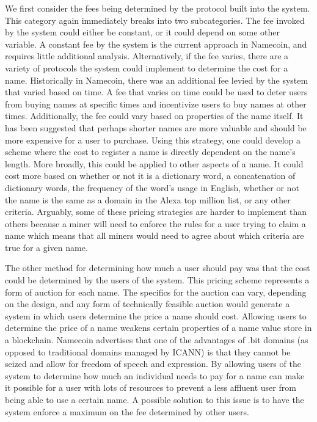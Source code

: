 We first consider the fees being determined by the protocol built into the system. This category again immediately breaks into two subcategories. The fee invoked by the system could either be constant, or it could depend on some other variable. A constant fee by the system is the current approach in Namecoin, and requires little additional analysis. Alternatively, if the fee varies, there are a variety of protocols the system could implement to determine the cost for a name. Historically in Namecoin, there was an additional fee levied by the system that varied based on time. A fee that varies on time could be used to deter users from buying names at specific times and incentivize users to buy names at other times. Additionally, the fee could vary based on properties of the name itself. It has been suggested that perhaps shorter names are more valuable and should be more expensive for a user to purchase. Using this strategy, one could develop a scheme where the cost to register a name is directly dependent on the name's length. More broadly, this could be applied to other aspects of a name. It could cost more based on whether or not it is a dictionary word, a concatenation of dictionary words, the frequency of the word's usage in English, whether or not the name is the same as a domain in the Alexa top million list, or any other criteria. Arguably, some of these pricing strategies are harder to implement than others because a miner will need to enforce the rules for a user trying to claim a name which means that all miners would need to agree about which criteria are true for a given name.

The other method for determining how much a user should pay was that the cost could be determined by the users of the system. This pricing scheme represents a form of auction for each name. The specifics for the auction can vary, depending on the design, and any form of technically feasible auction would generate a system in which users determine the price a name should cost.  Allowing users to determine the price of a name weakens certain properties of a name value store in a blockchain. Namecoin advertises that one of the advantages of .bit domains (as opposed to traditional domains managed by ICANN) is that they cannot be seized and allow for freedom of speech and expression. By allowing users of the system to determine how much an individual needs to pay for a name can make it possible for a user with lots of resources to prevent a less affluent user from being able to use a certain name. A possible solution to this issue is to have the system enforce a maximum on the fee determined by other users. 

